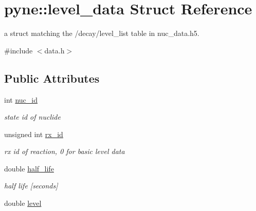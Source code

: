 \hypertarget{structpyne_1_1level__data}{}\section{pyne\+:\+:level\+\_\+data Struct Reference}
\label{structpyne_1_1level__data}


a struct matching the \textquotesingle{}/decay/level\+\_\+list\textquotesingle{} table in nuc\+\_\+data.\+h5.  




{\ttfamily \#include $<$data.\+h$>$}

\subsection*{Public Attributes}
\begin{DoxyCompactItemize}
\item 
int \hyperlink{structpyne_1_1level__data_aefac68a7a5aaedafd0b01f459e75adc8}{nuc\+\_\+id}\hypertarget{structpyne_1_1level__data_aefac68a7a5aaedafd0b01f459e75adc8}{}\label{structpyne_1_1level__data_aefac68a7a5aaedafd0b01f459e75adc8}

\begin{DoxyCompactList}\small\item\em state id of nuclide \end{DoxyCompactList}\item 
unsigned int \hyperlink{structpyne_1_1level__data_a52a8e7987f8f2a01fe7142bac5ab6adc}{rx\+\_\+id}\hypertarget{structpyne_1_1level__data_a52a8e7987f8f2a01fe7142bac5ab6adc}{}\label{structpyne_1_1level__data_a52a8e7987f8f2a01fe7142bac5ab6adc}

\begin{DoxyCompactList}\small\item\em rx id of reaction, 0 for basic level data \end{DoxyCompactList}\item 
double \hyperlink{structpyne_1_1level__data_a044daae5c914e096c423b95da1586dc0}{half\+\_\+life}\hypertarget{structpyne_1_1level__data_a044daae5c914e096c423b95da1586dc0}{}\label{structpyne_1_1level__data_a044daae5c914e096c423b95da1586dc0}

\begin{DoxyCompactList}\small\item\em half life \mbox{[}seconds\mbox{]} \end{DoxyCompactList}\item 
double \hyperlink{structpyne_1_1level__data_af029059b5f79cfa2ad22e6f9fcb04ac9}{level}\hypertarget{structpyne_1_1level__data_af029059b5f79cfa2ad22e6f9fcb04ac9}{}\label{structpyne_1_1level__data_af029059b5f79cfa2ad22e6f9fcb04ac9}


\end{DoxyCompactItemize}

